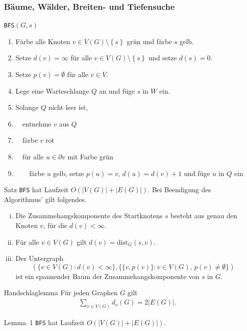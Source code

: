 \documentclass[aspectratio=1610, 11pt]{beamer}
\newcommand\dist{\mathrm{dist}}
\newcommand\cbc[1]{\left\{{#1}\right\}}
\newcommand{\mytitle}{B\"aume, W\"alder, Breiten- und Tiefensuche}
\begin{document}
\begin{frame}\frametitle{\mytitle}
	\begin{overprint}
		\begin{exampleblock}{{\tt BFS}$(G,s)$}
			\begin{enumerate}
				\item F\"arbe alle Knoten $v\in V(G)\setminus\cbc s$ gr\"un und f\"arbe $s$ gelb.
				\item Setze $d(v)=\infty$ f\"ur alle $v\in V(G)\setminus\cbc s$ und setze $d(s)=0$.
				\item Setze $p(v)=\emptyset$ f\"ur alle $v\in V$.
				\item Lege eine Warteschlange $Q$ an und f\"uge $s$ in $W$ ein.
				\item Solange $Q$ nicht leer ist,
				\item $\quad$entnehme $v$ aus $Q$
				\item $\quad$f\"arbe $v$ rot
				\item $\quad$f\"ur alle $u\in\partial v$ mit Farbe gr\"un
				\item $\quad\quad$f\"arbe $u$ gelb, setze $p(u)=v$, $d(u)=d(v)+1$ und f\"uge $u$ in $Q$ ein
			\end{enumerate}		
		\end{exampleblock}
		\begin{block}{Satz}
			{\tt BFS} hat Laufzeit $O(|V(G)|+|E(G)|)$.
			Bei Beendigung des Algorithmus' gilt folgendes.
			\begin{enumerate}[(i)]
				\item Die Zusammehangskomponente des Startknotens $s$ besteht aus genau den Knoten $v$, f\"ur die $d(v)<\infty$.
				\item F\"ur alle $v\in V(G)$ gilt $d(v)=\dist_G(s,v)$.
				\item Der Untergraph $$(\{v\in V(G):d(v)<\infty\},\{\{v,p(v)\}:v\in V(G),\,p(v)\neq\emptyset\})$$ ist ein spannender Baum der Zusammehangskomponente von $s$ in $G$.
			\end{enumerate}
		\end{block}
		\begin{block}{Handschlaglemma}
			F\"ur jeden Graphen $G$ gilt
			\begin{align*}
				\sum_{v\in V(G)}d_v(G)=2|E(G)|.
			\end{align*}
		\end{block}
		\begin{block}{Lemma~1}
			{\tt BFS} hat Laufzeit $O(|V(G)|+|E(G)|)$.

\end{block}
\end{overprint}
\end{frame}
\end{document}
